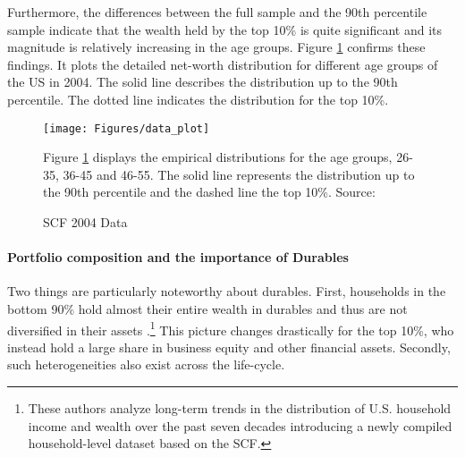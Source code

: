 \documentclass[12pt,a4paper,leqno]{article}
\theoremstyle{definition}
\begin{document}
Furthermore, the differences between the full sample and the 90th percentile sample indicate that the wealth held by the top 10\% is quite significant and its magnitude is relatively increasing in the age groups. Figure \ref{scf_data} confirms these findings. It plots the detailed net-worth distribution for different age groups of the US in 2004. The solid line describes the distribution up to the 90th percentile. The dotted line indicates the distribution for the top 10\%. 
\begin{figure}[!htbp]
\caption{SCF 2004 Data} 
\label{scf_data}	%
\centering
\texttt{[image: Figures/data\_plot]}  %

\begin{minipage}{0.8\linewidth}
\footnotesize{Figure \ref{scf_data} displays the empirical distributions for the age groups, 26-35, 36-45 and 46-55. The solid line represents the distribution up to the 90th percentile and the dashed line the top 10\%. Source: \cite{hintermaier2011}}
\end{minipage}

\end{figure}

\paragraph{Portfolio composition and the importance of Durables}
Two things are particularly noteworthy about durables. First, households in the bottom 90\% hold almost their entire wealth in durables and thus are not diversified in their assets \citep{kuhn2017income}.\footnote{These authors analyze long-term trends in the distribution of U.S. household income and wealth over the past seven decades introducing a newly compiled household-level dataset based on the SCF.} This picture changes drastically for the top 10\%, who instead hold a large share in business equity and other financial assets. Secondly, such heterogeneities also exist across the life-cycle. 
\end{document}
